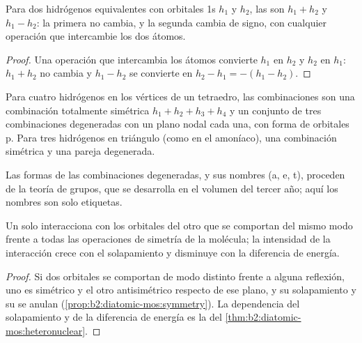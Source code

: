 \begin{proposition}\label{prop:b2:fragment-orbitals:h2-pair}
Para dos hidrógenos equivalentes con orbitales 1s $h_1$ y $h_2$, las
 son $h_1 + h_2$ y $h_1 - h_2$: la primera no
cambia, y la segunda cambia de signo, con cualquier operación que intercambie los dos
átomos.
\end{proposition}

\begin{proof}
Una operación que intercambia los átomos convierte $h_1$ en $h_2$ y $h_2$ en
$h_1$: $h_1 + h_2$ no cambia y $h_1 - h_2$ se convierte en $h_2 - h_1 = -(h_1 - h_2)$.
\end{proof}

\begin{proposition}\label{prop:b2:fragment-orbitals:h4}
Para cuatro hidrógenos en los vértices de un tetraedro, las combinaciones son una
combinación totalmente simétrica $h_1 + h_2 + h_3 + h_4$ y un conjunto de tres combinaciones
degeneradas con un plano nodal cada una, con forma de orbitales p. Para tres
hidrógenos en triángulo (como en el amoníaco), una combinación simétrica y una
pareja degenerada.
\end{proposition}

\admitted

Las formas de las combinaciones degeneradas, y sus nombres (a, e, t), proceden de la
teoría de grupos, que se desarrolla en el volumen del tercer año; aquí los nombres son solo etiquetas.

\begin{proposition}\label{prop:b2:fragment-orbitals:interaction-rules}
Un  solo interacciona con los orbitales del otro  que
se comportan del mismo modo frente a todas las operaciones de simetría de la molécula; la
intensidad de la interacción crece con el solapamiento y disminuye con la diferencia
de energía.
\end{proposition}

\begin{proof}
Si dos orbitales se comportan de modo distinto frente a alguna reflexión, uno es simétrico y
el otro antisimétrico respecto de ese plano, y su solapamiento y su
 se anulan (\cref{prop:b2:diatomic-mos:symmetry}). La dependencia del
solapamiento y de la diferencia de energía es la del \cref{thm:b2:diatomic-mos:heteronuclear}.
\end{proof}

